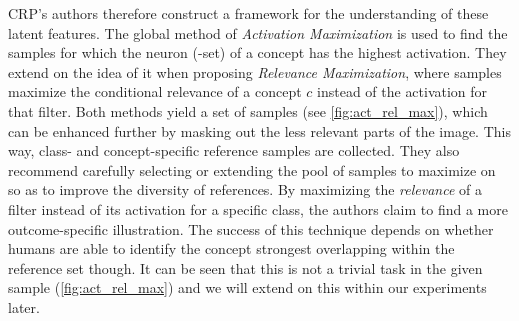 CRP's authors therefore construct a framework for the understanding of these latent features. The global method of \textit{Activation Maximization} \citep{Nguyen2016} is used to find the samples for which the neuron (-set) of a concept has the highest activation. They extend on the idea of it when proposing \textit{Relevance Maximization}, where samples maximize the conditional relevance of a concept $c$ instead of the activation for that filter. Both methods yield a set of samples (see \cref{fig:act_rel_max}), which can be enhanced further by masking out the less relevant parts of the image. This way, class- and concept-specific reference samples are collected. They also recommend carefully selecting or extending the pool of samples to maximize on so as to improve the diversity of references. By maximizing the \textit{relevance} of a filter instead of its activation for a specific class, the authors claim to find a more outcome-specific illustration. The success of this technique depends on whether humans are able to identify the concept strongest overlapping within the reference set though. It can be seen that this is not a trivial task in the given sample (\cref{fig:act_rel_max}) and we will extend on this within our experiments later. 

